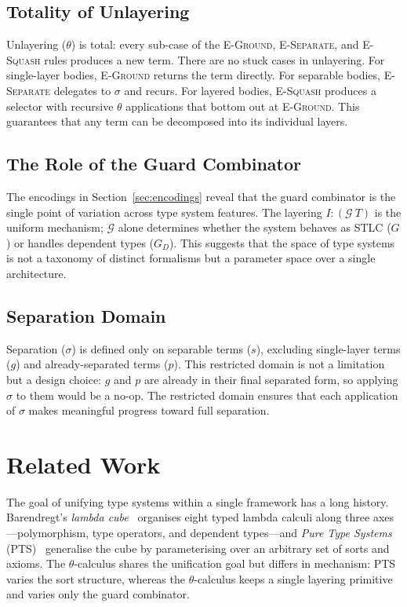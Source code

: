 \documentclass[11pt,letterpaper]{article}
\theoremstyle{definition}
\begin{document}
\subsection{Totality of Unlayering}

Unlayering ($\theta$) is total: every sub-case of the \textsc{E-Ground},
\textsc{E-Separate}, and \textsc{E-Squash} rules produces a new term. There
are no stuck cases in unlayering. For single-layer bodies,
\textsc{E-Ground} returns the term directly. For separable bodies,
\textsc{E-Separate} delegates to $\sigma$ and recurs. For layered bodies,
\textsc{E-Squash} produces a selector with recursive $\theta$ applications
that bottom out at \textsc{E-Ground}. This guarantees that any term can be
decomposed into its individual layers.

\subsection{The Role of the Guard Combinator}

The encodings in Section~\ref{sec:encodings} reveal that the guard combinator
is the single point of variation across type system features. The layering
$I{:}(\mathcal{G}\ T)$ is the uniform mechanism; $\mathcal{G}$ alone
determines whether the system behaves as STLC ($G$) or handles dependent
types ($G_D$). This suggests that the
space of type systems is not a taxonomy of distinct formalisms but a
parameter space over a single architecture.

\subsection{Separation Domain}

Separation ($\sigma$) is defined only on separable terms ($s$), excluding
single-layer terms ($g$) and already-separated terms ($p$). This restricted
domain is not a limitation but a design choice: $g$ and $p$ are already in
their final separated form, so applying $\sigma$ to them would be a no-op.
The restricted domain ensures that each application of $\sigma$ makes
meaningful progress toward full separation.


\section{Related Work}\label{sec:related}

The goal of unifying type systems within a single framework has a long
history. Barendregt's \emph{lambda cube}~\cite{barendregt1992} organises
eight typed lambda calculi along three axes---polymorphism, type operators,
and dependent types---and \emph{Pure Type Systems}
(PTS)~\cite{barendregt1992} generalise the cube by parameterising over an
arbitrary set of sorts and axioms. The $\theta$-calculus shares the
unification goal but differs in mechanism: PTS varies the sort structure,
whereas the $\theta$-calculus keeps a single layering primitive and varies
only the guard combinator.
\end{document}
